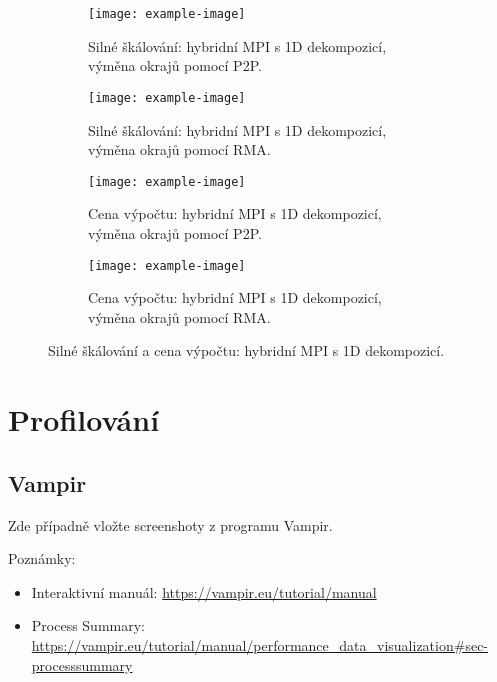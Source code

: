 \documentclass{article}
\begin{document}
\begin{figure}[H]
    \centering
    \begin{subfigure}{0.45\textwidth}
        \centering
        \texttt{[image: example-image]}
        \caption{Silné škálování: hybridní MPI s 1D dekompozicí, výměna okrajů pomocí P2P.}
        \label{fig:1D_MPI_P2P_hybrid}
    \end{subfigure}
    \hfill
    \begin{subfigure}{0.45\textwidth}
        \centering
        \texttt{[image: example-image]}
        \caption{Silné škálování: hybridní MPI s 1D dekompozicí, výměna okrajů pomocí RMA.}
        \label{fig:1D_MPI_RMA_ hybrid}
    \end{subfigure}

    \begin{subfigure}{0.45\textwidth}
        \centering
        \texttt{[image: example-image]}
        \caption{Cena výpočtu: hybridní MPI s 1D dekompozicí, výměna okrajů pomocí P2P.}
        \label{fig:1D_MPI_P2P_hybrid}
    \end{subfigure}
    \hfill
    \begin{subfigure}{0.45\textwidth}
        \centering
        \texttt{[image: example-image]}
        \caption{Cena výpočtu: hybridní MPI s 1D dekompozicí, výměna okrajů pomocí RMA.}
        \label{fig:1D_MPI_RMA_ hybrid}
    \end{subfigure}
    \caption{Silné škálování a cena výpočtu: hybridní MPI s 1D dekompozicí.}
    \label{fig:1D_MPI_hybrid}
\end{figure}

\section{Profilování}
\label{sec:profilovani}

\subsection{Vampir}
\label{subsec:vampir}

Zde případně vložte screenshoty z programu Vampir.

\noindent
Poznámky:
\begin{itemize}
    \item Interaktivní manuál: \url{https://vampir.eu/tutorial/manual}
    \item Process Summary: \url{https://vampir.eu/tutorial/manual/performance_data_visualization#sec-processsummary} 
\end{itemize}
\end{document}
